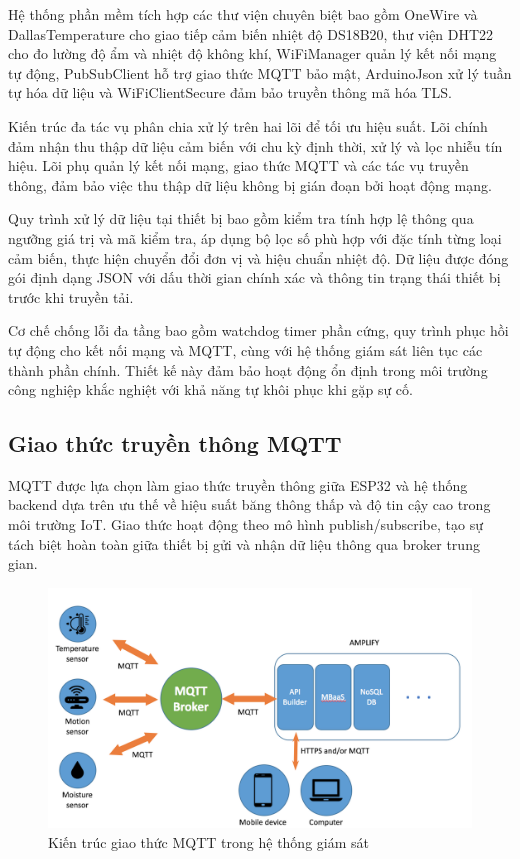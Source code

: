 \documentclass[../main.tex]{subfiles}
\begin{document}
Hệ thống phần mềm tích hợp các thư viện chuyên biệt bao gồm OneWire và DallasTemperature cho giao tiếp cảm biến nhiệt độ DS18B20, thư viện DHT22 cho đo lường độ ẩm và nhiệt độ không khí, WiFiManager quản lý kết nối mạng tự động, PubSubClient hỗ trợ giao thức MQTT bảo mật, ArduinoJson xử lý tuần tự hóa dữ liệu và WiFiClientSecure đảm bảo truyền thông mã hóa TLS.

Kiến trúc đa tác vụ phân chia xử lý trên hai lõi để tối ưu hiệu suất. Lõi chính đảm nhận thu thập dữ liệu cảm biến với chu kỳ định thời, xử lý và lọc nhiễu tín hiệu. Lõi phụ quản lý kết nối mạng, giao thức MQTT và các tác vụ truyền thông, đảm bảo việc thu thập dữ liệu không bị gián đoạn bởi hoạt động mạng.

Quy trình xử lý dữ liệu tại thiết bị bao gồm kiểm tra tính hợp lệ thông qua ngưỡng giá trị và mã kiểm tra, áp dụng bộ lọc số phù hợp với đặc tính từng loại cảm biến, thực hiện chuyển đổi đơn vị và hiệu chuẩn nhiệt độ. Dữ liệu được đóng gói định dạng JSON với dấu thời gian chính xác và thông tin trạng thái thiết bị trước khi truyền tải.

Cơ chế chống lỗi đa tầng bao gồm watchdog timer phần cứng, quy trình phục hồi tự động cho kết nối mạng và MQTT, cùng với hệ thống giám sát liên tục các thành phần chính. Thiết kế này đảm bảo hoạt động ổn định trong môi trường công nghiệp khắc nghiệt với khả năng tự khôi phục khi gặp sự cố.

\subsection{Giao thức truyền thông MQTT}
\label{sec:mqtt_protocol}

MQTT được lựa chọn làm giao thức truyền thông giữa ESP32 và hệ thống backend dựa trên ưu thế về hiệu suất băng thông thấp và độ tin cậy cao trong môi trường IoT. Giao thức hoạt động theo mô hình publish/subscribe, tạo sự tách biệt hoàn toàn giữa thiết bị gửi và nhận dữ liệu thông qua broker trung gian.

\begin{figure}[H]
    \centering
    \includegraphics[width=1\textwidth]{../Hinhve/MQTT.png}
    \caption{Kiến trúc giao thức MQTT trong hệ thống giám sát}
    \label{fig:mqtt_model}
\end{figure}
\end{document}
